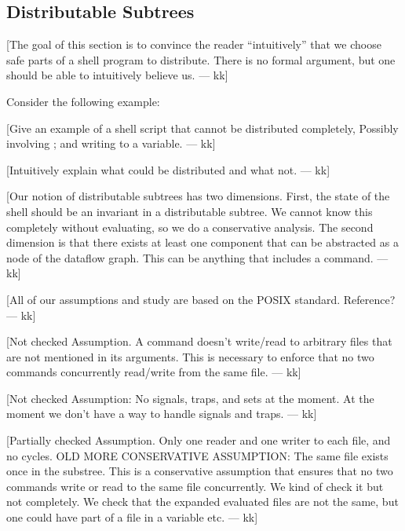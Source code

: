 \documentclass[sigplan,10pt,review,anonymous]{acmart}
\newcommand{\kk}[1]{[{\color{magenta}#1 --- kk}]}
\begin{document}
\subsection{Distributable Subtrees}

\kk{The goal of this section is to convince the reader ``intuitively''
  that we choose safe parts of a shell program to distribute. There is
  no formal argument, but one should be able to intuitively believe
  us.}

Consider the following example:

\kk{Give an example of a shell script that cannot be distributed
  completely, Possibly involving ; and writing to a variable.}

\kk{Intuitively explain what could be distributed and what not.}

\kk{Our notion of distributable subtrees has two dimensions. First,
  the state of the shell should be an invariant in a distributable
  subtree. We cannot know this completely without evaluating, so we do
  a conservative analysis. The second dimension is that there exists
  at least one component that can be abstracted as a node of the
  dataflow graph. This can be anything that includes a command.}


\kk{All of our assumptions and study are based on the POSIX
  standard. Reference?}

\kk{Not checked Assumption. A command doesn't write/read to arbitrary
  files that are not mentioned in its arguments. This is necessary to
  enforce that no two commands concurrently read/write from the same
  file.}

\kk{Not checked Assumption: No signals, traps, and sets at the
  moment. At the moment we don't have a way to handle signals and
  traps.}

\kk{Partially checked Assumption. Only one reader and one writer to
  each file, and no cycles. OLD MORE CONSERVATIVE ASSUMPTION: The same
  file exists once in the substree. This is a conservative assumption
  that ensures that no two commands write or read to the same file
  concurrently. We kind of check it but not completely. We check that
  the expanded evaluated files are not the same, but one could have
  part of a file in a variable etc.}
\end{document}
